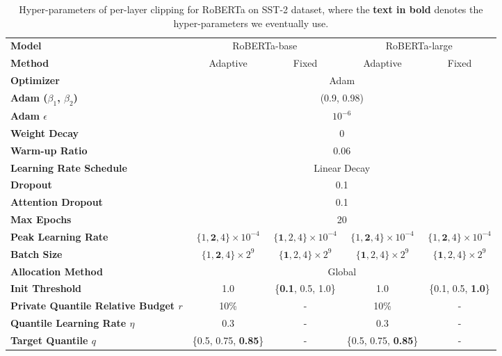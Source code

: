 
\begin{table*}[ht]
\footnotesize
\setlength\tabcolsep{2.4pt}
\centering 
\caption{Hyper-parameters of per-layer clipping for RoBERTa on SST-2 dataset, where the \textbf{text in bold} denotes the hyper-parameters we eventually use.} \label{tab:roberta_tuning_sst2}
\begin{tabular}{l cc cc}
\toprule
\textbf{Model} & \multicolumn{2}{c}{RoBERTa-base} & \multicolumn{2}{c}{RoBERTa-large}  \\
\textbf{Method} & Adaptive & Fixed  & Adaptive & Fixed \\ 
\midrule
\textbf{Optimizer} & \multicolumn{4}{c}{Adam} \\
\textbf{Adam ($\beta_1$, $\beta_2$)} & \multicolumn{4}{c}{(0.9, 0.98)}   \\
\textbf{Adam $\epsilon$} & \multicolumn{4}{c}{$10^{-6}$}   \\ 
\textbf{Weight Decay} & \multicolumn{4}{c}{0}   \\ 
\textbf{Warm-up Ratio} & \multicolumn{4}{c}{0.06} \\ 
\textbf{Learning Rate Schedule} & \multicolumn{4}{c}{Linear Decay}   \\ 
\textbf{Dropout} & \multicolumn{4}{c}{0.1} \\ 
\textbf{Attention Dropout} & \multicolumn{4}{c}{0.1} \\ 
\textbf{Max Epochs} & \multicolumn{4}{c}{20} \\
\midrule
\textbf{Peak Learning Rate} & $\{1,\textbf{2},4\}\times10^{-4}$ & $\{\textbf{1},2,4\}\times10^{-4}$ & $\{1,\textbf{2},4\}\times10^{-4}$ & $\{1,\textbf{2},4\}\times10^{-4}$\\ 
\textbf{Batch Size} & $\{1,\textbf{2},4\}\times2^{9}$ & $\{\textbf{1},2,4\}\times2^{9}$ & $\{\textbf{1},2,4\}\times2^{9}$ & $\{\textbf{1},2,4\}\times2^{9}$  \\ 
\textbf{Allocation Method} & \multicolumn{4}{c}{Global} \\
\textbf{Init Threshold} & 1.0 & \{\textbf{0.1}, 0.5, 1.0\} & 1.0 & \{0.1, 0.5, \textbf{1.0}\} \\
\textbf{Private Quantile Relative Budget $r$} & 10\% & - & 10\% & - \\ 
\textbf{Quantile Learning Rate $\eta$} & 0.3 & - & 0.3 & - \\ 
\textbf{Target Quantile $q$} & \{0.5, 0.75, \textbf{0.85}\} & -  & \{0.5, 0.75, \textbf{0.85}\} & -  \\
\bottomrule
\end{tabular}
\end{table*}